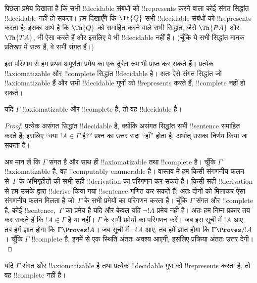 \documentclass[../../../include/open-logic-section]{subfiles}
\begin{document}
\begin{explain}
पिछला प्रमेय दिखाता है कि सभी !!{decidable} संबंधों को !!{represents} करने
वाला कोई संगत सिद्धांत !!{decidable} नहीं हो सकता। हम दिखाएँगे कि $\Th{Q}$
सभी !!{decidable} संबंधों को !!{represents} करता है; इसका अर्थ है कि $\Th{Q}$
को समाहित करने वाले सभी सिद्धांत, जैसे $\Th{PA}$ और $\Th{TA}$, भी ऐसा करते
हैं और इसलिए वे भी !!{decidable} नहीं हैं। (चूँकि ये सभी सिद्धांत मानक
प्रतिरूप में सत्य हैं, वे सभी संगत हैं।)

इस परिणाम से हम प्रथम अपूर्णता प्रमेय का एक दुर्बल रूप भी प्राप्त कर सकते
हैं। प्रत्येक !!{axiomatizable} और !!{complete} सिद्धांत !!{decidable} है।
अतः ऐसे संगत सिद्धांत जो !!{axiomatizable} हैं और सभी !!{decidable} गुणों को
!!{represents} करते हैं, !!{complete} नहीं हो सकते।
\end{explain}

\begin{thm}
यदि $\Gamma$ !!{axiomatizable} और !!{complete} है, तो वह !!{decidable} है।
\end{thm}

\begin{proof}
प्रत्येक असंगत सिद्धांत !!{decidable} है, क्योंकि असंगत सिद्धांत सभी
!!{sentence} समाहित करते हैं; इसलिए ``क्या $!A \in \Gamma$ है?'' प्रश्न का
उत्तर सदा ``हाँ'' होता है, अर्थात् उसका निर्णय किया जा सकता है।

अब मान लें कि $\Gamma$ संगत है और साथ ही !!{axiomatizable} तथा !!{complete}
है। चूँकि $\Gamma$ !!{axiomatizable} है, वह !!{computably enumerable} है।
वास्तव में हम किसी संगणनीय फलन से~$\Gamma$ के अभिगृहीतों की सभी सही
!!{derivation} का परिगणन कर सकते हैं। किसी सही !!{derivation} से हम उसके द्वारा
!!{derive} किया गया !!{sentence} गणित कर सकते हैं; अतः दोनों को मिलाकर ऐसा
संगणनीय फलन मिलता है जो~$\Gamma$ के सभी प्रमेयों का परिगणन करता है। चूँकि
$\Gamma$ संगत और !!{complete} है, कोई !!{sentence},~$\Gamma$ का प्रमेय है यदि
और केवल यदि $\lnot !A$ प्रमेय नहीं है। अतः हम निम्न प्रकार तय कर सकते हैं कि
$!A \in \Gamma$ है या नहीं। $\Gamma$ के सभी प्रमेयों का परिगणन करें। जब इस
सूची में $!A$ आए, तब हमें ज्ञात होगा कि $\Gamma \Proves !A$। जब सूची में
$\lnot !A$ आए, तब हमें ज्ञात होगा कि $\Gamma \Proves/ !A$। चूँकि $\Gamma$
!!{complete} है, इनमें से एक स्थिति अंततः अवश्य आएगी, इसलिए प्रक्रिया अंततः
उत्तर देगी।
\end{proof}

\begin{cor}
यदि $\Gamma$ संगत और !!{axiomatizable} है तथा प्रत्येक !!{decidable} गुण को
!!{represents} करता है, तो वह !!{complete} नहीं है।
\end{cor}
\end{document}
